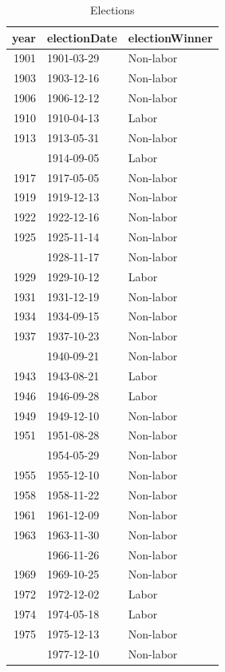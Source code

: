 \documentclass[12pt,]{article}
\theoremstyle{definition}
\theoremstyle{definition}
\theoremstyle{definition}
\theoremstyle{remark}
\begin{document}
\begin{table}

\caption{\label{tab:elections}Elections}
\centering
\fontsize{12}{14}\selectfont
\begin{tabular}[t]{rll}
\toprule
year & electionDate & electionWinner\\
\midrule
1901 & 1901-03-29 & Non-labor\\
1903 & 1903-12-16 & Non-labor\\
1906 & 1906-12-12 & Non-labor\\
1910 & 1910-04-13 & Labor\\
1913 & 1913-05-31 & Non-labor\\
\addlinespace
1914 & 1914-09-05 & Labor\\
1917 & 1917-05-05 & Non-labor\\
1919 & 1919-12-13 & Non-labor\\
1922 & 1922-12-16 & Non-labor\\
1925 & 1925-11-14 & Non-labor\\
\addlinespace
1928 & 1928-11-17 & Non-labor\\
1929 & 1929-10-12 & Labor\\
1931 & 1931-12-19 & Non-labor\\
1934 & 1934-09-15 & Non-labor\\
1937 & 1937-10-23 & Non-labor\\
\addlinespace
1940 & 1940-09-21 & Non-labor\\
1943 & 1943-08-21 & Labor\\
1946 & 1946-09-28 & Labor\\
1949 & 1949-12-10 & Non-labor\\
1951 & 1951-08-28 & Non-labor\\
\addlinespace
1954 & 1954-05-29 & Non-labor\\
1955 & 1955-12-10 & Non-labor\\
1958 & 1958-11-22 & Non-labor\\
1961 & 1961-12-09 & Non-labor\\
1963 & 1963-11-30 & Non-labor\\
\addlinespace
1966 & 1966-11-26 & Non-labor\\
1969 & 1969-10-25 & Non-labor\\
1972 & 1972-12-02 & Labor\\
1974 & 1974-05-18 & Labor\\
1975 & 1975-12-13 & Non-labor\\
\addlinespace
1977 & 1977-12-10 & Non-labor\\

\end{tabular}
\end{table}
\end{document}
